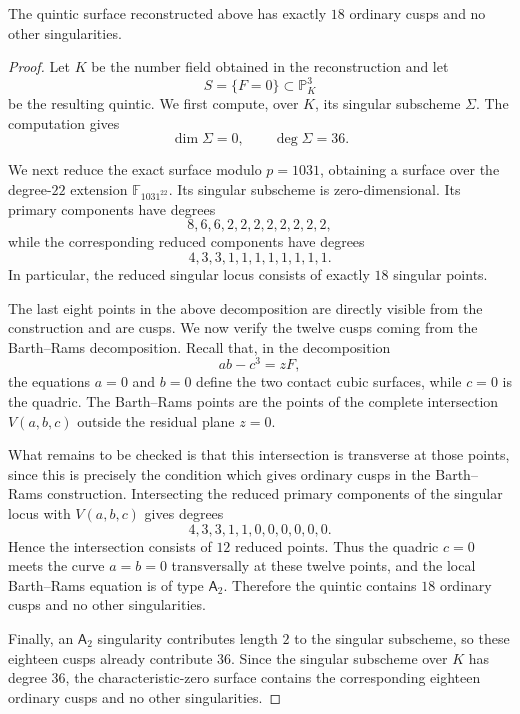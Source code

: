 \documentclass[10pt,a4paper]{amsart}
\begin{document}
\begin{theorem}
The quintic surface reconstructed above has exactly $18$ ordinary cusps and no
other singularities.
\end{theorem}

\begin{proof}
Let $K$ be the number field obtained in the reconstruction and let
\[
        S=\{F=0\}\subset\mathbb P^3_K
\]
be the resulting quintic.  We first compute, over $K$, its
singular subscheme $\Sigma$.
The computation gives
\[
        \dim\Sigma=0,\qquad \deg\Sigma=36.
\]

We next reduce the exact surface modulo $p=1031$, obtaining a surface over
the degree-$22$ extension $\mathbb F_{1031^{22}}$.
Its singular subscheme is zero-dimensional.
Its primary components have degrees
\[
        8,6,6,2,2,2,2,2,2,2,2,
\]
while the corresponding reduced components have degrees
\[
        4,3,3,1,1,1,1,1,1,1,1.
\]
In particular, the reduced singular locus consists of exactly $18$ singular points.


The last eight points in the above decomposition are directly visible from
the construction and are cusps.  We now verify the twelve cusps coming from
the Barth--Rams decomposition.  Recall that, in the decomposition
\[
        ab-c^3=zF,
\]
the equations $a=0$ and $b=0$ define the two contact cubic surfaces, while
$c=0$ is the quadric.  The Barth--Rams points are the points of the complete
intersection $V(a,b,c)$ outside the residual plane $z=0$.

What remains to be checked is that this intersection is transverse at those
points, since this is precisely the condition which gives ordinary cusps in
the Barth--Rams construction.  Intersecting the reduced primary components
of the singular locus with $V(a,b,c)$ gives degrees
\[
        4,3,3,1,1,0,0,0,0,0,0.
\]
Hence the intersection consists of $12$
reduced points.  Thus the quadric $c=0$ meets the curve $a=b=0$
transversally at these twelve points, and the local Barth--Rams equation is
of type $\mathsf A_2$.  Therefore the quintic contains $18$ ordinary cusps and
no other singularities.

Finally, an $\mathsf A_2$ singularity contributes
length $2$ to the singular subscheme, so these eighteen cusps already
contribute $36$.
Since the singular subscheme over $K$ has degree $36$,
the characteristic-zero surface contains the corresponding
eighteen ordinary cusps and no other singularities.

\end{proof}
\end{document}
